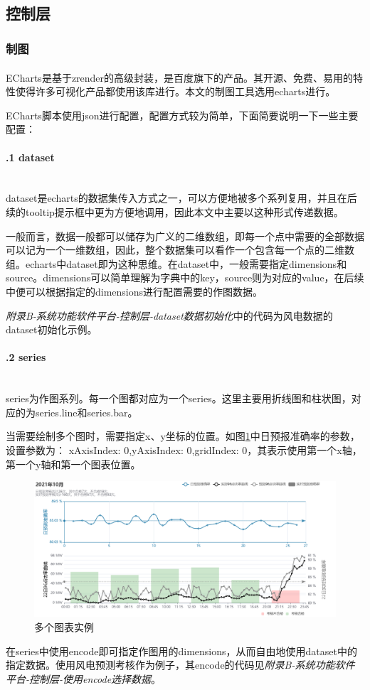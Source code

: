 \documentclass[winfonts,UTF8,a4paper]{ctexart}
\newcommand{\upcite}[1]{{\textsuperscript{\cite{#1}}}}
\begin{document}
\subsection{控制层}
\subsubsection{制图}\label{zhitu}


ECharts是基于zrender的高级封装\upcite{li2018echarts}，是百度旗下的产品。其开源、免费、易用的特性使得许多可视化产品都使用该库进行。本文的制图工具选用echarts进行。

ECharts脚本使用json进行配置，配置方式较为简单，下面简要说明一下一些主要配置：
\paragraph{\thesubsubsection.1 dataset}\ \\

dataset是echarts的数据集传入方式之一，可以方便地被多个系列复用，并且在后续的tooltip提示框中更为方便地调用，因此本文中主要以这种形式传递数据。

一般而言，数据一般都可以储存为广义的二维数组，即每一个点中需要的全部数据可以记为一个一维数组，因此，整个数据集可以看作一个包含每一个点的二维数组。echarts中dataset即为这种思维。在dataset中，一般需要指定dimensions和source。dimensions可以简单理解为字典中的key，source则为对应的value，在后续中便可以根据指定的dimensions进行配置需要的作图数据。

\textit{附录B-系统功能软件平台-控制层-dataset数据初始化}中的代码为风电数据的dataset初始化示例。


\paragraph{\thesubsubsection.2 series}\label{xAxisIndexyAxisIndex}\ \\

series为作图系列。每一个图都对应为一个series。这里主要用折线图和柱状图，对应的为series.line和series.bar。


当需要绘制多个图时，需要指定x、y坐标的位置。如图\ref{fig:screenshot002}中日预报准确率的参数，设置参数为：	xAxisIndex: 0,yAxisIndex: 0,gridIndex: 0，其表示使用第一个x轴，第一个y轴和第一个图表位置。
\begin{figure}[H]
	\centering
	\includegraphics[width=0.8\linewidth]{pic/screenshot002}
	\caption{多个图表实例}
	\label{fig:screenshot002}
\end{figure}
在series中使用encode即可指定作图用的dimensions，从而自由地使用dataset中的指定数据。使用风电预测考核作为例子，其encode的代码见\textit{附录B-系统功能软件平台-控制层-使用encode选择数据}。
\end{document}
